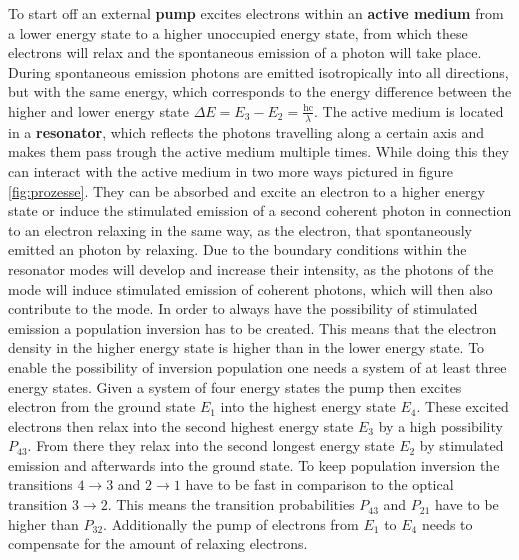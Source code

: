         To start off an external \textbf{pump} excites electrons within an \textbf{active medium} from a lower energy state to a higher unoccupied energy state, from which these electrons will relax and the
        spontaneous emission of a photon will take place. During spontaneous emission photons are emitted isotropically into all directions, but with the same energy, which corresponds to the energy difference
        between the higher and lower energy state $\Delta E = E_3 - E_2 = \frac{\text{hc}}{\lambda}$. The active medium is located in a \textbf{resonator}, which reflects the photons travelling along a certain axis and makes them pass trough the active medium
        multiple times. While doing this they can interact with the active medium in two more ways pictured in figure \ref{fig:prozesse}. They can be absorbed and excite an electron to a higher energy state or
        induce the stimulated emission of a second coherent photon in connection to an electron relaxing in the same way, as the electron, that spontaneously emitted an photon by relaxing. Due to the 
        boundary conditions within the resonator modes will develop and increase their intensity, as the photons of the mode will induce stimulated emission of coherent photons, 
        which will then also contribute to the mode. In order to always 
        have the possibility of stimulated emission a population inversion has to be created. This means that the electron density in the higher energy state is higher than in the lower energy state. To enable
        the possibility of inversion population one needs a system of at least three energy states. Given a system of four energy states the pump then excites electron from the ground state $E_{\text{1}}$ into 
        the highest energy state $E_{\text{4}}$. These excited electrons then relax into the second highest energy state $E_{\text{3}}$ by a high possibility $P_{\text{43}}$. From there they relax into the 
        second longest energy state $E_{\text{2}}$ by stimulated emission and afterwards into the ground state. To keep population inversion the transitions $4\rightarrow3$ and $2\rightarrow1$ have to be fast in
        comparison to the optical transition $3\rightarrow2$. This means the transition probabilities $P_{\text{43}}$ and $P_{\text{21}}$ have to be higher than $P_{\text{32}}$. Additionally the pump of 
        electrons from $E_{\text{1}}$ to $E_{\text{4}}$ needs to compensate for the amount of relaxing electrons.

